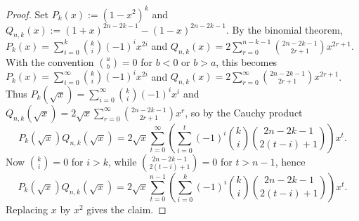 \documentclass[11pt,twoside]{article}
\newcommand{\EulerB}[2]{\left\langle {#1 \atop #2} \right\rangle^{\!B}}
\newtheorem{lemma}[theorem]{Lemma}
\numberwithin{equation}{section}
\begin{document}
\begin{proof}
Set $\displaystyle P_k(x):=(1-x^2)^k$ and $\displaystyle Q_{n,k}(x):=(1+x)^{2n-2k-1}-(1-x)^{2n-2k-1}$. By the binomial theorem,
$\displaystyle P_k(x)=\sum_{i=0}^{k}\binom{k}{i}(-1)^i x^{2i}$ and
$\displaystyle Q_{n,k}(x)=2\sum_{r=0}^{n-k-1}\binom{2n-2k-1}{2r+1}x^{2r+1}$.
With the convention $\displaystyle \binom{a}{b}=0$ for $b<0$ or $b>a$, this becomes
$\displaystyle P_k(x)=\sum_{i=0}^{\infty}\binom{k}{i}(-1)^i x^{2i}$ and
$\displaystyle Q_{n,k}(x)=2\sum_{r=0}^{\infty}\binom{2n-2k-1}{2r+1}x^{2r+1}$.
Thus
$\displaystyle P_k(\sqrt{x})=\sum_{i=0}^{\infty}\binom{k}{i}(-1)^i x^i$ and
$\displaystyle Q_{n,k}(\sqrt{x})=2\sqrt{x}\sum_{r=0}^{\infty}\binom{2n-2k-1}{2r+1}x^r$, so by the Cauchy product
\[
P_k(\sqrt{x})Q_{n,k}(\sqrt{x})
=
2\sqrt{x}\sum_{t=0}^{\infty}
\left(\sum_{i=0}^{t}(-1)^i\binom{k}{i}\binom{2n-2k-1}{2(t-i)+1}\right)x^t.
\]
Now $\displaystyle \binom{k}{i}=0$ for $i>k$, while $\displaystyle \binom{2n-2k-1}{2(t-i)+1}=0$ for $t>n-1$, hence
\[
P_k(\sqrt{x})Q_{n,k}(\sqrt{x})
=
2\sqrt{x}\sum_{t=0}^{n-1}
\left(\sum_{i=0}^{k}(-1)^i\binom{k}{i}\binom{2n-2k-1}{2(t-i)+1}\right)x^t.
\]
Replacing $x$ by $x^2$ gives the claim.
\end{proof}

\end{document}

